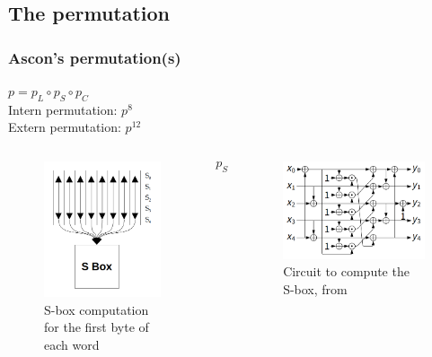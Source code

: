 \documentclass{beamer}
\begin{document}
	\subsection{The permutation}
	\begin{frame}
		\frametitle{Ascon's permutation(s)}
		$p = p_L \circ p_S \circ p_C$\\
		Intern permutation: $p^8$\\
		Extern permutation: $p^{12}$
		
		\begin{columns}[T]
			\begin{figure}[h]
				\centering
				\includegraphics[width=0.6\linewidth]{img_files/sbox_computation}
				\caption{S-box computation for the first byte of each word}
				\label{fig:comp}
			\end{figure}
			
			$$p_S$$
			\begin{figure}
				\includegraphics[scale=0.2]{img_files/circuit}
				\caption{Circuit to compute the S-box, from \cite{norme}}
				\label{circuit_sbox}
			\end{figure}
			
		\end{columns}
	\end{frame}
	
\end{document}

